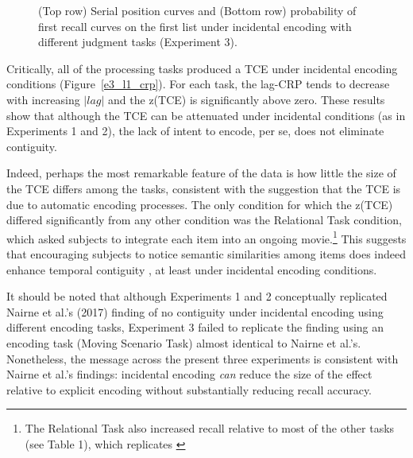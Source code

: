 \documentclass[man,natbib,floatsintext]{apa6} %
\begin{document}
\begin{figure}
\caption{(Top row) Serial position curves and (Bottom row) probability of first recall curves on the first list under incidental encoding with different judgment tasks (Experiment 3).\spcpaneltext}
\label{e3_l1_spc}
\end{figure}

Critically, all of the processing tasks produced a TCE under incidental encoding conditions (Figure~\ref{e3_l1_crp}). For each task, the lag-CRP tends to decrease with increasing $|lag|$ and the z(TCE) is significantly above zero. These results show that although the TCE can be attenuated under incidental conditions (as in Experiments 1 and 2), the lack of intent to encode, per se, does not eliminate contiguity.

Indeed, perhaps the most remarkable feature of the data is how little the size of the TCE differs among the tasks, consistent with the suggestion that the TCE is due to automatic encoding processes. The only condition for which the z(TCE) differed significantly from any other condition was the Relational Task condition, which asked subjects to integrate each item into an ongoing movie.\footnote{The Relational Task also increased recall relative to most of the other tasks (see Table 1), which replicates \citet{BowClar69}} This suggests that encouraging subjects to notice semantic similarities among items does indeed enhance temporal contiguity \citep{Hint16}, at least under incidental encoding conditions.

It should be noted that although Experiments 1 and 2 conceptually replicated Nairne et al.'s (2017) finding of no contiguity under incidental encoding using different encoding tasks, Experiment 3 failed to replicate the finding using an encoding task (Moving Scenario Task) almost identical to Nairne et al.'s. Nonetheless, the message across the present three experiments is consistent with Nairne et al.'s findings: incidental encoding \emph{can} reduce the size of the effect relative to explicit encoding without substantially reducing recall accuracy.
\end{document}

